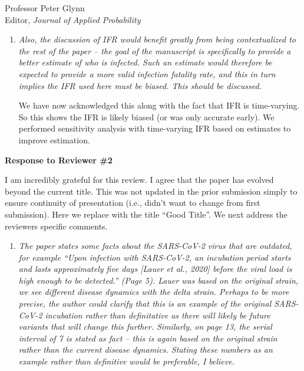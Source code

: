 \documentclass[11pt]{letter} %
\begin{document}
\begin{letter}{Professor
	Peter Glynn\\
	Editor, {\em Journal of Applied Probability}}
\begin{enumerate}
\begin{enumerate}
	We now describe the model in more detail.
	\vspace{5mm}
	\item {\it Also, the discussion of IFR would benefit greatly from being contextualized to the rest of the paper – the goal of the manuscript is specifically to provide a better estimate of who is infected. Such an estimate would therefore be expected to provide a more valid infection fatality rate, and this in turn implies the IFR used here must be biased. This should be discussed.}
	\vspace{5mm}

    We have now acknowledged this along with the fact that IFR is time-varying. So this shows the IFR is likely biased (or was only accurate early).  We performed sensitivity analysis with time-varying IFR based on estimates to improve estimation.
	\vspace{5mm}
\end{enumerate}
\end{enumerate}
\newpage

{\bf Response to Reviewer \#2}

I am incredibly grateful for this review.  I agree that the paper has evolved beyond the current title.  This was not updated in the prior submission simply to ensure continuity of presentation (i.e., didn't want to change from first submission).  Here we replace with the title ``Good Title''.  We next address the reviewers specific comments.

\begin{enumerate}
\item {\it The paper states some facts about the SARS-CoV-2 virus that are outdated, for example “Upon infection with SARS-CoV-2, an incubation period starts and lasts approximately five days [Lauer et al., 2020] before the viral load is high enough to be detected.” (Page 5). Lauer was based on the original
strain, we see different disease dynamics with the delta strain. Perhaps to be more precise, the author could clarify that this is an example of the original SARS-CoV-2 incubation rather than definitative as there will likely be future variants that will change this further. Similarly, on page 13, the serial
interval of 7 is stated as fact – this is again based on the original strain rather than the current disease dynamics. Stating these numbers as an example rather than definitive would be preferable, I believe.}
\vspace{5mm}


\end{enumerate}
\end{letter}
\end{document}
